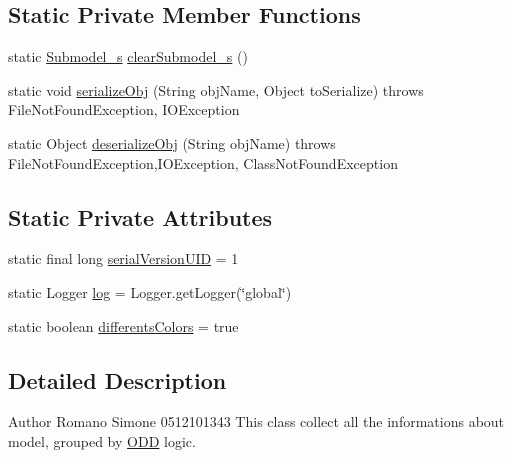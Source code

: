\subsection*{Static Private Member Functions}
\begin{DoxyCompactItemize}
\item 
static \hyperlink{classit_1_1isislab_1_1masonhelperdocumentation_1_1_o_d_d_1_1_submodel__s}{Submodel\-\_\-s} \hyperlink{classit_1_1isislab_1_1masonhelperdocumentation_1_1_o_d_d_1_1_o_d_d_a967fd254c4e555432b7dba443855922e}{clear\-Submodel\-\_\-s} ()
\item 
static void \hyperlink{classit_1_1isislab_1_1masonhelperdocumentation_1_1_o_d_d_1_1_o_d_d_a75c591cb9280595f4f3a3201dea04645}{serialize\-Obj} (String obj\-Name, Object to\-Serialize)  throws File\-Not\-Found\-Exception, I\-O\-Exception 
\item 
static Object \hyperlink{classit_1_1isislab_1_1masonhelperdocumentation_1_1_o_d_d_1_1_o_d_d_aa78df716eeec3477e70f23918ca29b6b}{deserialize\-Obj} (String obj\-Name)  throws File\-Not\-Found\-Exception,\-I\-O\-Exception, Class\-Not\-Found\-Exception 
\end{DoxyCompactItemize}
\subsection*{Static Private Attributes}
\begin{DoxyCompactItemize}
\item 
static final long \hyperlink{classit_1_1isislab_1_1masonhelperdocumentation_1_1_o_d_d_1_1_o_d_d_a95288fab3531d37d72278c1d748be952}{serial\-Version\-U\-I\-D} = 1
\item 
static Logger \hyperlink{classit_1_1isislab_1_1masonhelperdocumentation_1_1_o_d_d_1_1_o_d_d_a70f0756b37ead1682120c1c080866663}{log} = Logger.\-get\-Logger(\char`\"{}global\char`\"{})
\item 
static boolean \hyperlink{classit_1_1isislab_1_1masonhelperdocumentation_1_1_o_d_d_1_1_o_d_d_ab09b176537cd5e168d67fc16112444dc}{differents\-Colors} = true
\end{DoxyCompactItemize}


\subsection{Detailed Description}
\begin{DoxyAuthor}{Author}
Romano Simone 0512101343 This class collect all the informations about model, grouped by \hyperlink{classit_1_1isislab_1_1masonhelperdocumentation_1_1_o_d_d_1_1_o_d_d}{O\-D\-D} logic. 
\end{DoxyAuthor}



